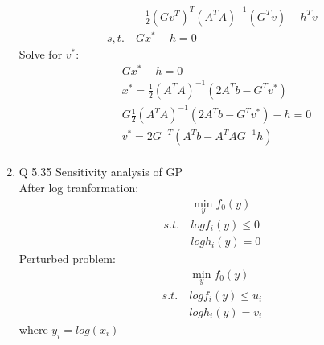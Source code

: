 \documentclass[12pt,letter]{article}
\begin{document}
\begin{enumerate}
\begin{align*}
    &-\frac{1}{2}(Gv^T)^T(A^TA)^{-1}(G^Tv) -h^Tv\\
    s,t.\ & Gx^*-h=0
  \end{align*}
  Solve for $v^*$:\\
  \begin{align*}
    &Gx^*-h=0\\
    &x^* = \frac{1}{2}(A^TA)^{-1}(2A^Tb - G^Tv^*)\\
    &G\frac{1}{2}(A^TA)^{-1}(2A^Tb - G^Tv^*)-h=0\\
    &v^*=2G^{-T}(A^Tb-A^TAG^{-1}h)\\
  \end{align*}
  \pagebreak
\item Q 5.35 Sensitivity analysis of GP\\
  After log tranformation:
  \begin{align*}
    &\min_y f_0(y)\\
    s.t.\ & log f_i(y) \leq 0\\
    & log h_i(y) = 0
  \end{align*}
  Perturbed problem:
  \begin{align*}
    &\min_y f_0(y)\\
    s.t.\ & log f_i(y) \leq u_i\\
    & log h_i(y) = v_i
  \end{align*}
  where $y_i = log(x_i)$\\
  

\end{enumerate}
\end{document}
